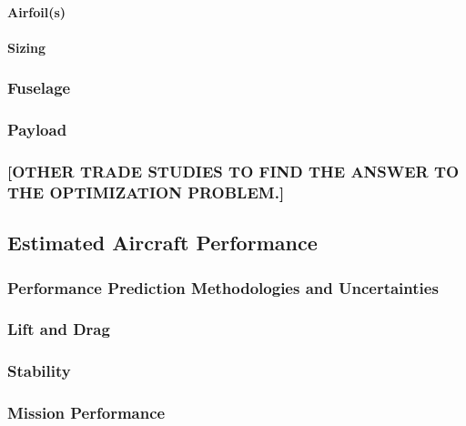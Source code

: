 \documentclass[report]{byu-aero}
\begin{document}
\paragraph{Airfoil(s)}

\paragraph{Sizing}

\subsubsection{Fuselage}

\subsubsection{Payload}

\subsubsection{\color{\BYUred} [OTHER TRADE STUDIES TO FIND THE ANSWER TO THE OPTIMIZATION PROBLEM.]}


\subsection{Estimated Aircraft Performance}
\label{ssec:estaircraftperfomance}

\subsubsection{Performance Prediction Methodologies and Uncertainties}
\label{sssec:uncertaintyanalysis}




\subsubsection{Lift and Drag}
\label{sssec:liftdrag}




\subsubsection{Stability}
\label{sssec:stability}



\subsubsection{Mission Performance}
\label{sssec:missionperformance}
\end{document}
